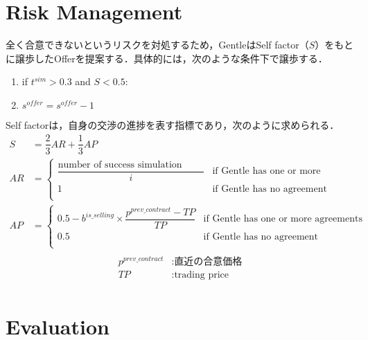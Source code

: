 \documentclass[uplatex, 10pt, a4j]{jsarticle}
\begin{document}
\section{\textrm{Risk Management}}
全く合意できないというリスクを対処するため，GentleはSelf factor（$S$）をもとに譲歩したOfferを提案する．具体的には，次のような条件下で譲歩する．
\begin{enumerate}[\hspace{20mm}1\textrm{:}]
    \item \hspace{10mm} if $t^{sim}>0.3$ and $S<0.5$:
    \item \hspace{10mm} \qquad $s^{offer} = s^{offer} - 1$
\end{enumerate}
Self factorは，自身の交渉の進捗を表す指標であり，次のように求められる．
\begin{equation*}
    \begin{split}
        S &= \dfrac{2}{3}AR + \dfrac{1}{3}AP \\
        AR &= \left\{\begin{array}{ll}
            \dfrac{\text{number of success simulation steps}}{i} & \text{if Gentle has one or more agreements} \\
            1                                                    & \text{if Gentle has no agreement}           \\
        \end{array}\right. \\
        AP &= \left\{\begin{array}{ll}
            0.5 - b^{is\_selling} \times \dfrac{p^{prev\_contract}-TP}{TP} & \text{if Gentle has one or more agreements} \\
            0.5                                                            & \text{if Gentle has no agreement}           \\
        \end{array}\right. \\
    \end{split}
\end{equation*}
\begin{equation*}
    \begin{split}
        p^{prev\_contract} &: \text{直近の合意価格} \\
        TP &: \text{trading price} \\
    \end{split}
\end{equation*}

\section{\textrm{Evaluation}}
\end{document}
